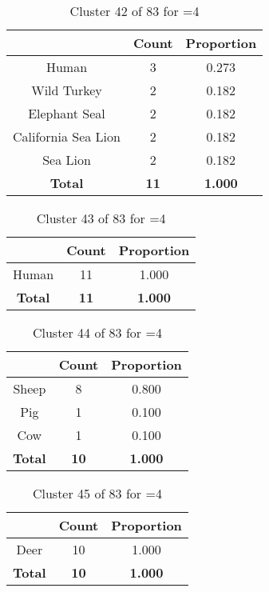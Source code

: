 \begin{table}[ht!]
\centering
\begin{tabular}{|c|c|c|}
\hline
\bf \Spec{} &\bf Count &\bf Proportion\\ \hline \hline
Human & 3 & 0.273\\ \hline
Wild Turkey & 2 & 0.182\\ \hline
Elephant Seal & 2 & 0.182\\ \hline
California Sea Lion & 2 & 0.182\\ \hline
Sea Lion & 2 & 0.182\\ \hline
\hline
\bf Total & \bf 11 & \bf 1.000\\ \hline
\end{tabular}
\label{tab:cluster:42:4}
\caption{Cluster 42 of 83 for \minneigh{}=4}
\end{table}

\begin{table}[ht!]
\centering
\begin{tabular}{|c|c|c|}
\hline
\bf \Spec{} &\bf Count &\bf Proportion\\ \hline \hline
Human & 11 & 1.000\\ \hline
\hline
\bf Total & \bf 11 & \bf 1.000\\ \hline
\end{tabular}
\label{tab:cluster:43:4}
\caption{Cluster 43 of 83 for \minneigh{}=4}
\end{table}

\begin{table}[ht!]
\centering
\begin{tabular}{|c|c|c|}
\hline
\bf \Spec{} &\bf Count &\bf Proportion\\ \hline \hline
Sheep & 8 & 0.800\\ \hline
Pig & 1 & 0.100\\ \hline
Cow & 1 & 0.100\\ \hline
\hline
\bf Total & \bf 10 & \bf 1.000\\ \hline
\end{tabular}
\label{tab:cluster:44:4}
\caption{Cluster 44 of 83 for \minneigh{}=4}
\end{table}

\begin{table}[ht!]
\centering
\begin{tabular}{|c|c|c|}
\hline
\bf \Spec{} &\bf Count &\bf Proportion\\ \hline \hline
Deer & 10 & 1.000\\ \hline
\hline
\bf Total & \bf 10 & \bf 1.000\\ \hline
\end{tabular}
\label{tab:cluster:45:4}
\caption{Cluster 45 of 83 for \minneigh{}=4}
\end{table}

